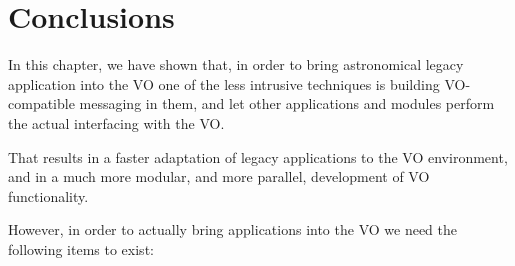 	
	\section{Conclusions} %
	\label{sec:legacy_conclusions}
		
		In this chapter, we have shown that, in order to bring
		astronomical legacy application into the VO one of the
		less intrusive techniques is building VO-compatible
		messaging in them, and let other applications and modules
		perform the actual interfacing with the VO.
		
		That results in a faster adaptation of legacy applications
		to the VO environment, and in a much more modular, and
		more parallel, development of VO functionality.
		
		However, in order to actually bring applications into the
		VO we need the following items to exist:
		
